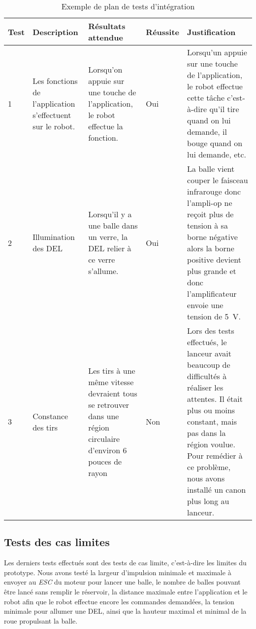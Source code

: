 \begin{table}[h!]
    \centering
    \begin{tabular}{p{0.25in}p{1.5in}p{1.5in}p{0.5in}p{1.5in}}
        \hline
        \bfseries Test & \bfseries Description & \bfseries Résultats attendue & \bfseries Réussite & \bfseries Justification \\
        \hline\hline
        1 & Les fonctions de l’application s’effectuent sur le robot. & Lorsqu’on appuie sur une touche de l’application, le robot effectue la fonction. & Oui & Lorsqu’un appuie sur une touche de l’application, le robot effectue cette tâche c’est-à-dire qu’il tire quand on lui demande, il bouge quand on lui demande, etc. \\
        2 & Illumination des DEL & Lorsqu’il y a une balle dans un verre, la DEL relier à ce verre s’allume. & Oui & La balle vient couper le faisceau infrarouge donc l’ampli-op ne reçoit plus de tension à sa borne négative alors la borne positive devient plus grande et donc l’amplificateur envoie une tension de 5~V. \\
        3 & Constance des tirs & Les tirs à une même vitesse devraient tous se retrouver dans une région circulaire d’environ 6 pouces de rayon & Non & Lors des tests effectués, le lanceur avait beaucoup de difficultés à réaliser les attentes. Il était plus ou moins constant, mais pas dans la région voulue. Pour remédier à ce problème, nous avons installé un canon plus long au lanceur. \\
        \hline
    \end{tabular}
    \caption{Exemple de plan de tests d'intégration}
    \label{tab:s3-test-integration}
\end{table}

\subsection{Tests des cas limites}

Les derniers tests effectués sont des tests de cas limite, c’est-à-dire les limites du prototype.
Nous avons testé la largeur d’impulsion minimale et maximale à envoyer au \emph{ESC} du moteur pour lancer une balle, le nombre de balles pouvant être lancé sans remplir le réservoir, la distance maximale entre l’application et le robot afin que le robot effectue encore les commandes demandées, la tension minimale pour allumer une DEL, ainsi que la hauteur maximal et minimal de la roue propulsant la balle.

